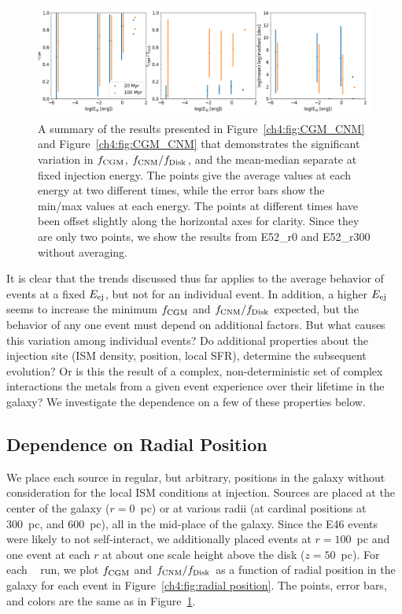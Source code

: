  \begin{figure}
   \centering
   \includegraphics[width=0.975\linewidth]{figures/ch4/II_Eej_CNM_avg}
   \caption{A summary of the results presented in Figure~\ref{ch4:fig:CGM_CNM} and Figure~\ref{ch4:fig:CGM_CNM} that demonstrates the significant variation in $f_{\rm CGM}$, $f_{\rm CNM} / f_{\rm Disk}$, and the mean-median separate at fixed injection energy. The points give the average values at each energy at two different times, while the error bars show the min/max values at each energy. The points at different times have been offset slightly along the horizontal axes for clarity. Since they are only two points, we show the results from \runone E52\_r0 and \runone E52\_r300 without averaging.}
   \label{ch4:fig:CGM_CNM_variance}
 \end{figure}


It is clear that the trends discussed thus far applies to the average behavior of events at a fixed $E_{\rm ej}$, but not for an individual event. In addition, a higher $E_{\rm ej}$ seems to increase the minimum $f_{\rm CGM}$ and $f_{\rm CNM} / f_{\rm Disk}$ expected, but the behavior of any one event must depend on additional factors. But what causes this variation among individual events? Do additional properties about the injection site (ISM density, position, local SFR), determine the subsequent evolution? Or is this the result of a complex, non-deterministic set of complex interactions the metals from a given event experience over their lifetime in the galaxy? We investigate the dependence on a few of these properties below.

\subsection{Dependence on Radial Position}
\label{ch4:sec:radial position}
We place each source in regular, but arbitrary, positions in the galaxy without consideration for the local ISM conditions at injection. Sources are placed at the center of the galaxy ($r = 0$~pc) or at various radii (at cardinal positions at 300~pc, and 600~pc), all in the mid-place of the galaxy. Since the E46 events were likely to not self-interact, we additionally placed events at $r = 100$~pc and one event at each $r$ at about one scale height above the disk ($z = 50$~pc). For each \runonenu~ run, we plot $f_{\rm CGM}$ and $f_{\rm CNM} / f_{\rm Disk}$ as a function of radial position in the galaxy for each event in Figure~\ref{ch4:fig:radial position}. The points, error bars, and colors are the same as in Figure~\ref{ch4:fig:CGM_CNM_variance}.


